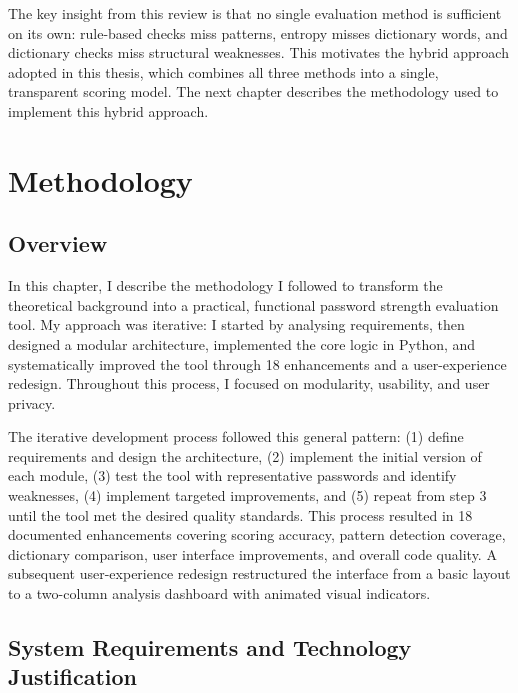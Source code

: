 The key insight from this review is that no single evaluation method is sufficient on its own: rule-based checks miss patterns, entropy misses dictionary words, and dictionary checks miss structural weaknesses. This motivates the hybrid approach adopted in this thesis, which combines all three methods into a single, transparent scoring model. The next chapter describes the methodology used to implement this hybrid approach.

\chapter{Methodology}

\section{Overview}

In this chapter, I describe the methodology I followed to transform the theoretical background into a practical, functional password strength evaluation tool. My approach was iterative: I started by analysing requirements, then designed a modular architecture, implemented the core logic in Python, and systematically improved the tool through 18 enhancements and a user-experience redesign. Throughout this process, I focused on modularity, usability, and user privacy.

The iterative development process followed this general pattern: (1) define requirements and design the architecture, (2) implement the initial version of each module, (3) test the tool with representative passwords and identify weaknesses, (4) implement targeted improvements, and (5) repeat from step 3 until the tool met the desired quality standards. This process resulted in 18 documented enhancements covering scoring accuracy, pattern detection coverage, dictionary comparison, user interface improvements, and overall code quality. A subsequent user-experience redesign restructured the interface from a basic layout to a two-column analysis dashboard with animated visual indicators.

\clearpage

\section{System Requirements and Technology Justification}

